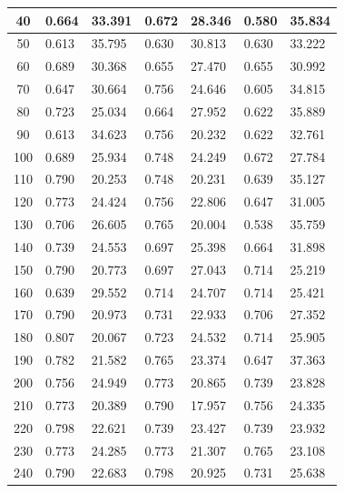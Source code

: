 \documentclass{report}
\begin{document}
\begin{minipage}{\textwidth}
\begin{longtable}{|c|l|l|l|l|l|l|}
                     40 & 0.664 & 33.391 & 0.672 & 28.346 & 0.580 & 35.834 \\ \hline
                     50 & 0.613 & 35.795 & 0.630 & 30.813 & 0.630 & 33.222 \\ \hline
                     60 & 0.689 & 30.368 & 0.655 & 27.470 & 0.655 & 30.992 \\ \hline
                     70 & 0.647 & 30.664 & 0.756 & 24.646 & 0.605 & 34.815 \\ \hline
                     80 & 0.723 & 25.034 & 0.664 & 27.952 & 0.622 & 35.889 \\ \hline
                     90 & 0.613 & 34.623 & 0.756 & 20.232 & 0.622 & 32.761 \\ \hline
                     100 & 0.689 & 25.934 & 0.748 & 24.249 & 0.672 & 27.784 \\ \hline
                     110 & 0.790 & 20.253 & 0.748 & 20.231 & 0.639 & 35.127 \\ \hline
                     120 & 0.773 & 24.424 & 0.756 & 22.806 & 0.647 & 31.005 \\ \hline
                     130 & 0.706 & 26.605 & 0.765 & 20.004 & 0.538 & 35.759 \\ \hline
                     140 & 0.739 & 24.553 & 0.697 & 25.398 & 0.664 & 31.898 \\ \hline
                     150 & 0.790 & 20.773 & 0.697 & 27.043 & 0.714 & 25.219 \\ \hline
                     160 & 0.639 & 29.552 & 0.714 & 24.707 & 0.714 & 25.421 \\ \hline
                     170 & 0.790 & 20.973 & 0.731 & 22.933 & 0.706 & 27.352 \\ \hline
                     180 & 0.807 & 20.067 & 0.723 & 24.532 & 0.714 & 25.905 \\ \hline
                     190 & 0.782 & 21.582 & 0.765 & 23.374 & 0.647 & 37.363 \\ \hline
                     200 & 0.756 & 24.949 & 0.773 & 20.865 & 0.739 & 23.828 \\ \hline
                     210 & 0.773 & 20.389 & 0.790 & 17.957 & 0.756 & 24.335 \\ \hline
                     220 & 0.798 & 22.621 & 0.739 & 23.427 & 0.739 & 23.932 \\ \hline
                     230 & 0.773 & 24.285 & 0.773 & 21.307 & 0.765 & 23.108 \\ \hline
                     240 & 0.790 & 22.683 & 0.798 & 20.925 & 0.731 & 25.638 \\ \hline

\end{longtable}
\end{minipage}
\end{document}
